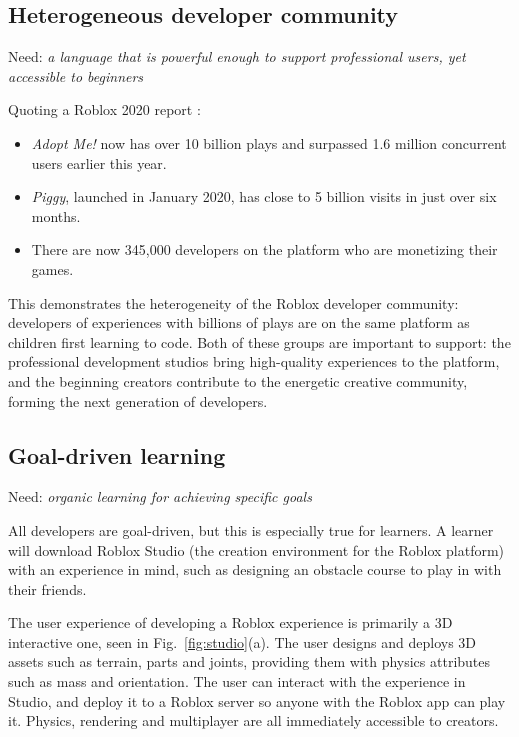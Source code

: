 \documentclass[acmsmall]{acmart}
\begin{document}
\subsection{Heterogeneous developer community}

Need: \emph{a language that is powerful enough to support professional users, yet accessible to beginners}

Quoting a Roblox 2020 report \cite{RobloxDevelopers}:
\begin{itemize}
\item \emph{Adopt Me!} now has over 10 billion plays and surpassed 1.6 million concurrent users earlier this year.
\item \emph{Piggy}, launched in January 2020, has close to 5 billion visits in just over six months.
\item There are now 345,000 developers on the platform who are monetizing their games.
\end{itemize}
This demonstrates the heterogeneity of the Roblox developer community:
developers of experiences with billions of plays are on the same
platform as children first learning to code. Both of these groups are important to
support: the professional development studios bring high-quality experiences to the
platform, and the beginning creators contribute to the energetic creative community,
forming the next generation of developers.

\subsection{Goal-driven learning}

Need: \emph{organic learning for achieving specific goals}

All developers are goal-driven, but this is especially true for
learners. A learner will download Roblox Studio
(the creation environment for the Roblox platform) with an
experience in mind, such as designing an obstacle course
to play in with their friends.

The user experience of developing a Roblox experience is primarily a
3D interactive one, seen in Fig.~\ref{fig:studio}(a). The user designs
and deploys 3D assets such as terrain, parts and joints, providing
them with physics attributes such as mass and orientation. The user
can interact with the experience in Studio, and deploy it to a Roblox
server so anyone with the Roblox app can play it. Physics, rendering
and multiplayer are all immediately accessible to creators.
\end{document}
